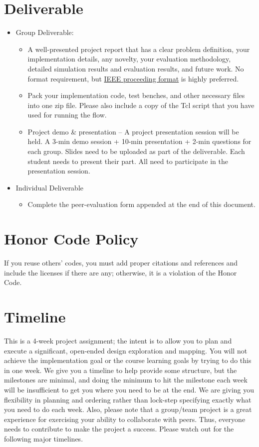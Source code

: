 \documentclass[a4paper,12pt,twoside]{article}
\begin{document}
\newpage

\section{Deliverable}
\begin{itemize}
    \item Group Deliverable:
    \begin{itemize}
        \item A well-presented project report that has a clear problem definition, your implementation details, any novelty, your evaluation methodology, detailed simulation results and evaluation results, and future work. No format requirement, but \href{https://www.ieee.org/conferences/publishing/templates.html}{IEEE proceeding format} is highly preferred.
        \item Pack your implementation code, test benches, and other necessary files into one zip file. Please also include a copy of the Tcl script that you have used for running the flow.
        \item Project demo \& presentation – A project presentation session will be held. A 3-min demo session + 10-min presentation + 2-min questions for each group. Slides need to be uploaded as part of the deliverable. Each student needs to present their part. All need to participate in the presentation session.
    \end{itemize}
    \item Individual Deliverable
    \begin{itemize}
        \item Complete the peer-evaluation form appended at the end of this document.
    \end{itemize}
\end{itemize}


\section{Honor Code Policy}
If you reuse others' codes, you must add proper citations and references and include the licenses if there are any; otherwise, it is a violation of the Honor Code.

\section{Timeline}
This is a 4-week project assignment; the intent is to allow you to plan and execute a significant, open-ended design exploration and mapping. You will not achieve the implementation goal or the course learning goals by trying to do this in one week. We give you a timeline to help provide some structure, but the milestones are minimal, and doing the minimum to hit the milestone each week will be insufficient to get you where you need to be at the end. We are giving you flexibility in planning and ordering rather than lock-step specifying exactly what you need to do each week. Also, please note that a group/team project is a great experience for exercising your ability to collaborate with peers. Thus, everyone needs to contribute to make the project a success. Please watch out for the following major timelines.
\end{document}
